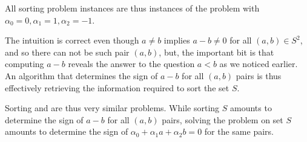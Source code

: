 All sorting problem instances are thus instances of the \twoLDT problem with
$\alpha_0 = 0, \alpha_1 = 1, \alpha_2 = -1$.

The intuition is correct even though $a \neq b$ implies $a-b \neq 0$ for all
$(a,b) \in S^2$, and so there can not be such pair $(a,b)$, but, the important
bit is that computing $a-b$ reveals the answer to the question $a<b$ as we
noticed earlier. An algorithm that determines the sign of $a-b$ for all $(a,b)$
pairs is thus effectively retrieving the information required to sort the set
$S$.

Sorting and \twoLDT are thus very similar problems. While sorting $S$ amounts
to determine the sign of $a-b$ for all $(a,b)$ pairs, solving the \twoLDT
problem on set $S$ amounts to determine the sign of $\alpha_0 + \alpha_1 a +
\alpha_2 b = 0$ for the same pairs.
